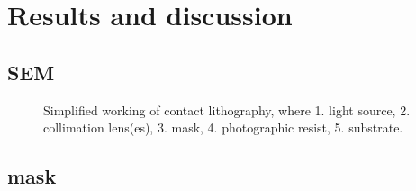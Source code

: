 \section*{Results and discussion}

\subsection*{SEM}
\begin{figure}[H]
	\centering
	\resizebox{\linewidth}{!}{}
	\caption{Simplified working of contact lithography, where 1. light source, 2. collimation lens(es), 3. mask, 4. photographic resist, 5. substrate.}
	\label{fig:contact-litho}
\end{figure}


\subsection*{mask}